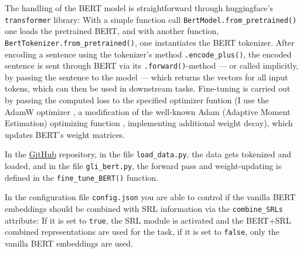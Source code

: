 
The handling of the BERT model is straightforward through huggingface's \texttt{transformer}
library: With a simple function call \texttt{BertModel.from\_pretrained()} one loads the
pretrained BERT, and with another function, \texttt{BertTokenizer.from\_pretrained()},
one instantiates the BERT tokenizer. After encoding a sentence using the tokenizer's
method \texttt{.encode\_plus()}, the encoded sentence is sent through BERT via its
\texttt{.forward()}-method --- or called implicitly, by passing the sentence to the model ---
which returns the vectors for all input tokens, which can then be used in downstream tasks.
Fine-tuning is carried out by passing the computed loss to the specified optimizer funtion
(I use the AdamW optimizer \citep{loshchilov2019decoupled}, a modification of the well-known
Adam (Adaptive Moment Estimation) optimizing function \citep{kingma2014adam}, implementing
additional weight decay), which updates BERT's weight matrices.

\begin{tcolorbox}[
  colback=blue!5!white,
  colframe=blue!75!black,
  title={\centering Code}]

  In the \href{https://github.com/JonathanSchaber/Masterarbeit}{GitHub} repository, in
  the file \texttt{load\_data.py}, the data gets tokenized and loaded, and in
  the file \texttt{gli\_bert.py}, the forward pass and weight-updating is
  defined in the \texttt{fine\_tune\_BERT()} function.

  In the configuration file \texttt{config.json} you are able to control if the vanilla BERT
  embeddings should be combined with SRL information via the \texttt{combine\_SRLs} attribute:
  If it is set to \texttt{true}, the SRL module is activated and the BERT+SRL combined
  representations are used for the task, if it is set to \texttt{false}, only the vanilla
  BERT embeddings are used.

\end{tcolorbox}




